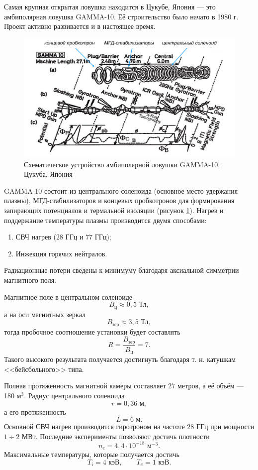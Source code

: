 Самая крупная открытая ловушка находится в Цукубе, Япония --- это амбиполярная ловушка GAMMA-10. Её строительство было начато в 1980 г. \cite{gamma10_history} Проект активно развивается и в настоящее время.


\begin{figure}[h]
\centering
\includegraphics[width=0.9\linewidth]{./fig/ch1/GAMMA10}
\caption{Схематическое устройство амбиполярной ловушки GAMMA-10, Цукуба, Япония}
\label{fig:GAMMA10}
\end{figure}


GAMMA-10 состоит из центрального соленоида (основное место удержания плазмы), МГД-стабилизаторов и концевых пробкотронов для формирования запирающих потенциалов и термальной изоляции (рисунок \ref{fig:GAMMA10}). Нагрев и поддержание температуры плазмы производится двумя способами:
\begin{enumerate}
\item СВЧ нагрев (28 ГГц и 77 ГГц);
\item Инжекция горячих нейтралов.
\end{enumerate}
Радиационные потери сведены к минимуму благодаря аксиальной симметрии магнитного поля\cite{gamma10_review}.

Магнитное поле в центральном соленоиде 
\[
B_{\text{ц}} \approx 0,5 \text{ Тл},
\]
а на оси магнитных зеркал
\[
B_{\text{зер}} \approx 3,5 \text{ Тл},
\]
тогда пробочное соотношение установки будет составлять
\begin{equation}
R = \frac{B_{\text{зер}}}{B_{\text{ц}}} = 7.
\end{equation}
Такого высокого результата получается достигнуть благодаря т. н. катушкам <<бейсбольного>> типа.

Полная протяженность магнитной камеры составляет 27 метров, а её объём --- 180 м$^3$. Радиус центрального соленоида
\[
r = 0,36 \text{ м},
\]
а его протяженность 
\[
L = 6 \text{ м}.
\]
Основной СВЧ нагрев производится гиротроном на частоте 28 ГГц при мощности $1\div2$ МВт.
Последние эксперименты позволяют достичь плотности \cite{sumida2015high}
\[
n_e = 4,4 \cdot 10^{-18} \text{ м}^{-3}.
\] 
Максимальные температуры, которые получается достичь
\[
T_i = 4 \text{ кэВ}, \qquad T_e = 1 \text{ кэВ}.
\]

